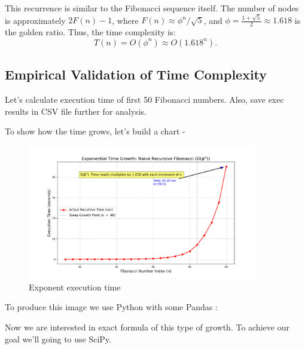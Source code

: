 \documentclass{article}
\begin{document}
This recurrence is similar to the Fibonacci sequence itself. The number of nodes is approximately \( 2F(n) - 1 \), where \( F(n) \approx \phi^n / \sqrt{5} \), and \( \phi = \frac{1 + \sqrt{5}}{2} \approx 1.618 \) is the golden ratio. Thus, the time complexity is:
\[
T(n) = O(\phi^n) \approx O(1.618^n).
\]

\subsection{Empirical Validation of Time Complexity}
Let's calculate execution time of first 50 Fibonacci numbers. Also, save exec results in CSV file further for analysis.

To show how the time grows, let's build a chart -
\begin{figure}[H]
	\centering
	\includegraphics[width=0.9\textwidth]{./recursive-time-exec/exponential-time-growth.png}
	\caption{Exponent execution time}
	\label{fig:exponent_growth}
\end{figure}

To produce this image we use Python with some Pandas :


Now we are interested in exact formula of this type of growth. To achieve our goal we'll going to use SciPy.

\end{document}
